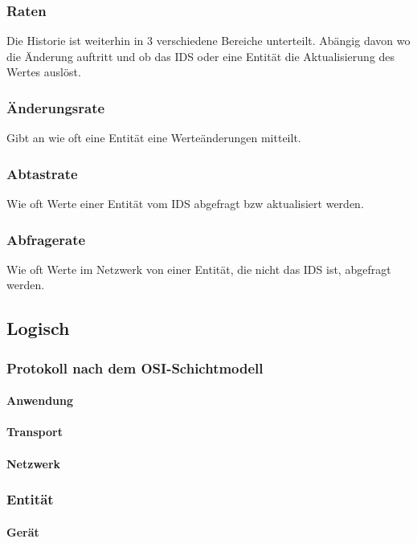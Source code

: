 \subsubsection{Raten}
Die Historie ist weiterhin in 3 verschiedene Bereiche unterteilt. Abängig davon wo die Änderung auftritt und ob das IDS oder eine Entität die Aktualisierung des Wertes auslöst.
\subsubsection{Änderungsrate} 
Gibt an wie oft eine Entität eine Werteänderungen mitteilt.
\subsubsection{Abtastrate}
Wie oft Werte einer Entität vom IDS abgefragt bzw aktualisiert werden.
\subsubsection{Abfragerate}
Wie oft Werte im Netzwerk von einer Entität, die nicht das IDS ist, abgefragt werden.

\subsection{Logisch}

\subsubsection{Protokoll nach dem OSI-Schichtmodell}

\paragraph{Anwendung}
\paragraph{Transport}
\paragraph{Netzwerk}

\subsubsection{Entität}
\paragraph{Gerät}
